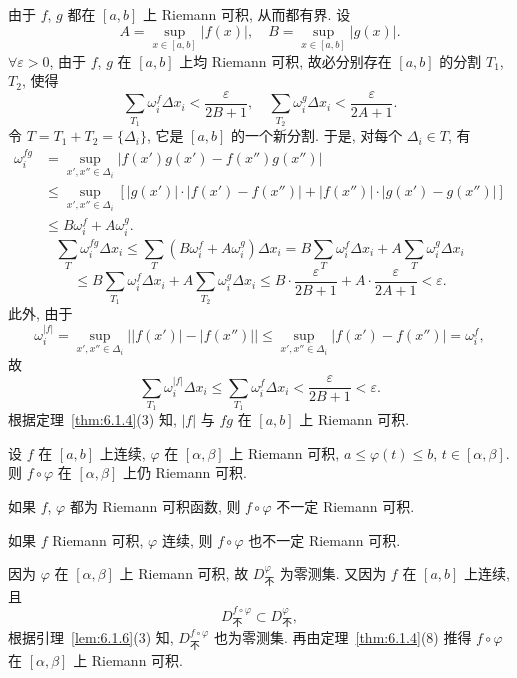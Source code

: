 \begin{solution}[证法 2]
由于 $f$, $g$ 都在 $[a,b]$ 上 Riemann 可积, 从而都有界. 设
\[
A=\sup_{x\in[a,b]}|f(x)|,\quad B=\sup_{x\in[a,b]}|g(x)|.
\]
$\forall\varepsilon>0$, 由于 $f$, $g$ 在 $[a,b]$ 上均 Riemann 可积, 故必分别存在 $[a,b]$ 的分割 $T_{1}$, $T_{2}$, 使得
\[
\sum_{T_{1}}\omega_{i}^{f}\Delta x_{i}<\frac{\varepsilon}{2B+1},\quad\sum_{T_{2}}\omega_{i}^{g}\Delta x_{i}<\frac{\varepsilon}{2A+1}.
\]
令 $T=T_{1}+T_{2}=\{\Delta_{i}\}$, 它是 $[a,b]$ 的一个新分割. 于是, 对每个 $\Delta_{i}\in T$, 有
\begin{align*}
\omega_{i}^{fg}&=\sup_{x',x''\in\Delta_{i}}|f(x')g(x')-f(x'')g(x'')|\\
&\leqslant\sup_{x',x''\in\Delta_{i}}\left[|g(x')|\cdot|f(x')-f(x'')|+|f(x'')|\cdot|g(x')-g(x'')|\right]\\
&\leqslant B\omega_{i}^{f}+A\omega_{i}^{g}.
\end{align*}
\[
\sum_{T}\omega_{i}^{fg}\Delta x_{i}\leqslant\sum_{T}\left(B\omega_{i}^{f}+A\omega_{i}^{g}\right)\Delta x_{i}=B\sum_{T}\omega_{i}^{f}\Delta x_{i}+A\sum_{T}\omega_{i}^{g}\Delta x_{i}
\]
\[
\leqslant B\sum_{T_{1}}\omega_{i}^{f}\Delta x_{i}+A\sum_{T_{2}}\omega_{i}^{g}\Delta x_{i}\leqslant B\cdot\frac{\varepsilon}{2B+1}+A\cdot\frac{\varepsilon}{2A+1}<\varepsilon.
\]
此外, 由于
\[
\omega_{i}^{|f|}=\sup_{x',x''\in\Delta_{i}}\left||f(x')|-|f(x'')|\right|\leqslant\sup_{x',x''\in\Delta_{i}}|f(x')-f(x'')|=\omega_{i}^{f},
\]
故
\[
\sum_{T_{1}}\omega_{i}^{|f|}\Delta x_{i}\leqslant\sum_{T_{1}}\omega_{i}^{f}\Delta x_{i}<\frac{\varepsilon}{2B+1}<\varepsilon.
\]
根据定理~\ref{thm:6.1.4}(3) 知, $|f|$ 与 $fg$ 在 $[a,b]$ 上 Riemann 可积.
\end{solution}

\begin{example}\label{ex:6.1.10}
设 $f$ 在 $[a,b]$ 上连续, $\varphi$ 在 $[\alpha,\beta]$ 上 Riemann 可积, $a\leqslant\varphi(t)\leqslant b$, $t\in[\alpha,\beta]$. 则 $f\circ\varphi$ 在 $[\alpha,\beta]$ 上仍 Riemann 可积.

如果 $f$, $\varphi$ 都为 Riemann 可积函数, 则 $f\circ\varphi$ 不一定 Riemann 可积.

如果 $f$ Riemann 可积, $\varphi$ 连续, 则 $f\circ\varphi$ 也不一定 Riemann 可积.
\end{example}

\begin{solution}[证法 1]
因为 $\varphi$ 在 $[\alpha,\beta]$ 上 Riemann 可积, 故 $D_{\text{不}}^{\varphi}$ 为零测集. 又因为 $f$ 在 $[a,b]$ 上连续, 且
\[
D_{\text{不}}^{f\circ\varphi}\subset D_{\text{不}}^{\varphi},
\]
根据引理~\ref{lem:6.1.6}(3) 知, $D_{\text{不}}^{f\circ\varphi}$ 也为零测集. 再由定理~\ref{thm:6.1.4}(8) 推得 $f\circ\varphi$ 在 $[\alpha,\beta]$ 上 Riemann 可积.
\end{solution}

